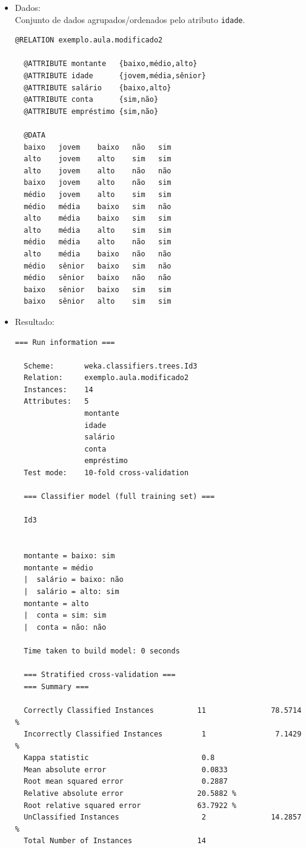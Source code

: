 \documentclass[
    article,            %
    11pt,               %
    oneside,            %
    a4paper,            %
    english,            %
    brazil,             %
    sumario=tradicional,
    ]{abntex2}
\begin{document}
\begin{itemize}
  \item Dados:\\
  Conjunto de dados agrupados/ordenados pelo atributo \texttt{idade}.
  \begin{Verbatim}[frame=single, fontsize=\tiny]
  @RELATION exemplo.aula.modificado2

  @ATTRIBUTE montante   {baixo,médio,alto}
  @ATTRIBUTE idade      {jovem,média,sênior}
  @ATTRIBUTE salário    {baixo,alto}
  @ATTRIBUTE conta      {sim,não}
  @ATTRIBUTE empréstimo {sim,não}

  @DATA
  baixo   jovem    baixo   não   sim 
  alto    jovem    alto    sim   sim 
  alto    jovem    alto    não   não 
  baixo   jovem    alto    não   sim 
  médio   jovem    alto    sim   sim 
  médio   média    baixo   sim   não 
  alto    média    baixo   sim   sim 
  alto    média    alto    sim   sim 
  médio   média    alto    não   sim 
  alto    média    baixo   não   não 
  médio   sênior   baixo   sim   não 
  médio   sênior   baixo   não   não 
  baixo   sênior   baixo   sim   sim 
  baixo   sênior   alto    sim   sim 
  \end{Verbatim}
  
  \item Resultado:
  \begin{Verbatim}[frame=single, fontsize=\tiny]
  === Run information ===

  Scheme:       weka.classifiers.trees.Id3 
  Relation:     exemplo.aula.modificado2
  Instances:    14
  Attributes:   5
                montante
                idade
                salário
                conta
                empréstimo
  Test mode:    10-fold cross-validation

  === Classifier model (full training set) ===

  Id3


  montante = baixo: sim
  montante = médio
  |  salário = baixo: não
  |  salário = alto: sim
  montante = alto
  |  conta = sim: sim
  |  conta = não: não

  Time taken to build model: 0 seconds

  === Stratified cross-validation ===
  === Summary ===

  Correctly Classified Instances          11               78.5714 %
  Incorrectly Classified Instances         1                7.1429 %
  Kappa statistic                          0.8   
  Mean absolute error                      0.0833
  Root mean squared error                  0.2887
  Relative absolute error                 20.5882 %
  Root relative squared error             63.7922 %
  UnClassified Instances                   2               14.2857 %
  Total Number of Instances               14     


\end{Verbatim}
\end{itemize}
\end{document}
